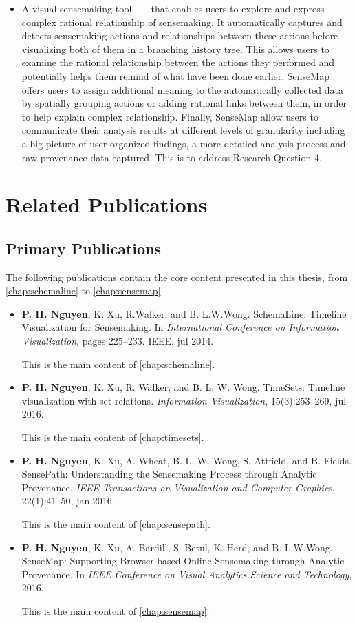 \begin{itemize}
	\item A visual sensemaking tool -- \emph{} -- that enables users to explore and express complex rational relationship of sensemaking. It automatically captures and detects sensemaking actions and relationships between these actions before visualizing both of them in a branching history tree. This allows users to examine the rational relationship between the actions they performed and potentially helps them remind of what have been done earlier. SenseMap offers users to assign additional meaning to the automatically collected data by spatially grouping actions or adding rational links between them, in order to help explain complex relationship. Finally, SenseMap allow users to communicate their analysis results at different levels of granularity including a big picture of user-organized findings, a more detailed analysis process and raw provenance data captured. This is to address Research Question 4.
\end{itemize}

\section{Related Publications}

\subsection{Primary Publications} 
The following publications contain the core content presented in this thesis, from \autoref{chap:schemaline} to \autoref{chap:sensemap}.

\begin{itemize}
\item \textbf{P. H. Nguyen}, K. Xu, R.Walker, and B. L.W.Wong. SchemaLine: Timeline Visualization for Sensemaking. In \textit{International Conference on Information Visualization}, pages 225--233. IEEE, jul 2014.

This is the main content of \autoref{chap:schemaline}.

\item \textbf{P. H. Nguyen}, K. Xu, R. Walker, and B. L. W. Wong. TimeSets: Timeline visualization with set relations. \textit{Information Visualization}, 15(3):253--269, jul 2016. 

This is the main content of \autoref{chap:timesets}.

\item \textbf{P. H. Nguyen}, K. Xu, A. Wheat, B. L. W. Wong, S. Attfield, and B. Fields. SensePath: Understanding the Sensemaking Process through Analytic Provenance. \textit{IEEE Transactions on Visualization and Computer Graphics}, 22(1):41--50, jan 2016.

This is the main content of \autoref{chap:sensepath}.

\item \textbf{P. H. Nguyen}, K. Xu, A. Bardill, S. Betul, K. Herd, and B. L.W.Wong. SenseMap: Supporting Browser-based Online Sensemaking through Analytic Provenance. In \textit{IEEE Conference on Visual Analytics Science and Technology}, 2016.

This is the main content of \autoref{chap:sensemap}.
\end{itemize}


